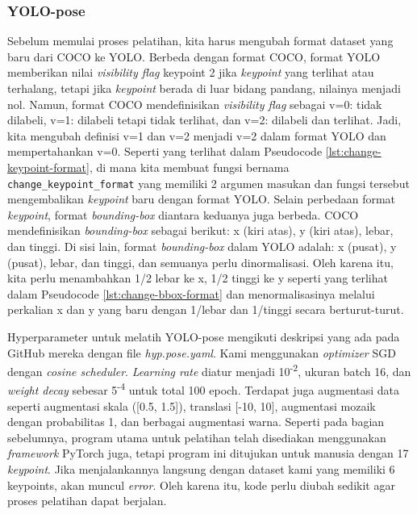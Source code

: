 \subsubsection{YOLO-pose}
\label{subsubsec:training-yolo-pose}

Sebelum memulai proses pelatihan, kita harus mengubah format dataset yang baru dari COCO ke YOLO. Berbeda dengan format COCO, format YOLO memberikan nilai \textit{visibility flag} keypoint 2 jika \textit{keypoint} yang terlihat atau terhalang, tetapi jika \textit{keypoint} berada di luar bidang pandang, nilainya menjadi nol.
Namun, format COCO mendefinisikan \textit{visibility flag} sebagai v=0: tidak dilabeli, v=1: dilabeli tetapi tidak terlihat, dan v=2: dilabeli dan terlihat. Jadi, kita mengubah definisi v=1 dan v=2 menjadi v=2 dalam format YOLO dan mempertahankan v=0. Seperti yang terlihat dalam Pseudocode \ref{lst:change-keypoint-format}, di mana kita membuat fungsi bernama \verb|change_keypoint_format| yang memiliki 2 argumen masukan dan fungsi tersebut mengembalikan \textit{keypoint} baru dengan format YOLO.
Selain perbedaan format \textit{keypoint}, format \textit{bounding-box} diantara keduanya juga berbeda. COCO mendefinisikan \textit{bounding-box} sebagai berikut: x (kiri atas), y (kiri atas), lebar, dan tinggi. Di sisi lain, format \textit{bounding-box} dalam YOLO adalah: x (pusat), y (pusat), lebar, dan tinggi, dan semuanya perlu dinormalisasi.
Oleh karena itu, kita perlu menambahkan 1/2 lebar ke x, 1/2 tinggi ke y seperti yang terlihat dalam Pseudocode \ref{lst:change-bbox-format} dan menormalisasinya melalui perkalian x dan y yang baru dengan 1/lebar dan 1/tinggi secara berturut-turut.
\newpage




Hyperparameter untuk melatih YOLO-pose mengikuti deskripsi yang ada pada GitHub mereka dengan file \emph{hyp.pose.yaml}.
Kami menggunakan \textit{optimizer} SGD dengan \textit{cosine scheduler}. \textit{Learning rate} diatur menjadi 10\textsuperscript{-2}, ukuran batch 16,
dan \textit{weight decay} sebesar 5\textsuperscript{-4} untuk total 100 epoch. Terdapat juga augmentasi data seperti augmentasi skala ([0.5, 1.5]),
translasi [-10, 10], augmentasi mozaik dengan probabilitas 1, dan berbagai augmentasi warna.
Seperti pada bagian sebelumnya, program utama untuk pelatihan telah disediakan menggunakan \textit{framework} PyTorch juga, tetapi program ini ditujukan untuk manusia dengan 17 \textit{keypoint}.
Jika menjalankannya langsung dengan dataset kami yang memiliki 6 keypoints, akan muncul \textit{error}. Oleh karena itu, kode perlu diubah sedikit agar proses pelatihan dapat berjalan.

